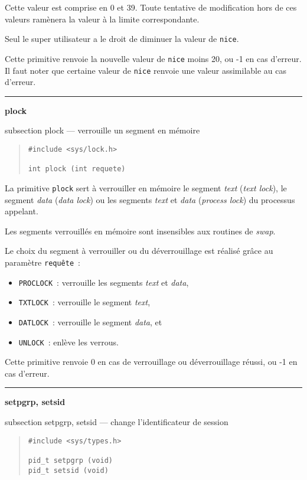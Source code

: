 \documentclass [twoside] {report}
\newcommand {\primitive} [1]
    {
	{\large \bf #1}
	\addcontentsline {toc} {subsection} {#1}
    }
\newcommand {\separation}
    {
	\vspace {7mm}
	\nopagebreak
	\hrule
    }
\begin{document}
Cette valeur est comprise en 0 et 39. Toute
tentative de modification hors de ces valeurs
ramènera la valeur à la limite correspondante.

Seul le super utilisateur a le droit de diminuer
la valeur de {\tt nice}.

Cette primitive renvoie la nouvelle valeur de
{\tt nice} moins 20, ou -1 en cas d'erreur. Il faut
noter que certaine valeur de {\tt nice} renvoie une
valeur assimilable au cas d'erreur.




\separation
\primitive {plock} --- verrouille un segment en mémoire

\begin {quote}
\begin {verbatim}
#include <sys/lock.h>

int plock (int requete)
\end{verbatim}
\end {quote}

La primitive {\tt plock} sert à verrouiller en
mémoire le segment {\it text} ({\it text lock}), le
segment {\it data} ({\it data lock}) ou les segments
{\it text} et {\it data} ({\it process lock}) du processus
appelant.

Les segments verrouillés en mémoire sont
insensibles aux routines de {\it swap}.

Le choix du segment à verrouiller ou du
déverrouillage est réalisé grâce au paramètre
{\tt requête}~:

\begin {itemize}
    \item {\tt PROCLOCK}~: verrouille les segments {\it text} et {\it data},
    \item {\tt TXTLOCK}~: verrouille le segment {\it text},
    \item {\tt DATLOCK}~: verrouille le segment {\it data}, et
    \item {\tt UNLOCK}~: enlève les verrous.
\end {itemize}

Cette primitive renvoie 0 en cas de verrouillage
ou déverrouillage réussi, ou -1 en cas d'erreur.




\separation
\primitive {setpgrp, setsid} --- change l'identificateur de session

\begin {quote}
\begin {verbatim}
#include <sys/types.h>

pid_t setpgrp (void)
pid_t setsid (void)
\end{verbatim}
\end {quote}
\end{document}
